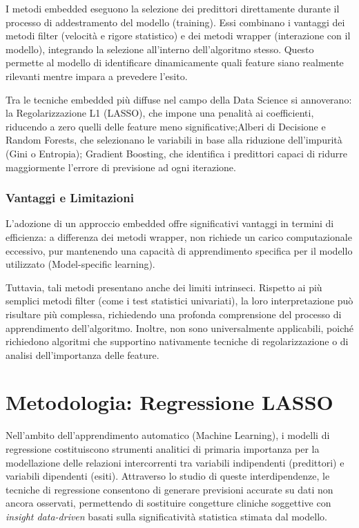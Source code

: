 \documentclass[11pt, oneside, noexaminfo]{sapthesis}   	%
\begin{document}
I metodi embedded eseguono la selezione dei predittori direttamente durante il processo di addestramento del modello (training). Essi combinano i vantaggi dei metodi filter (velocità e rigore statistico) e dei metodi wrapper (interazione con il modello), integrando la selezione all'interno dell'algoritmo stesso. Questo permette al modello di identificare dinamicamente quali feature siano realmente rilevanti mentre impara a prevedere l'esito.

Tra le tecniche embedded più diffuse nel campo della Data Science si annoverano:
la {Regolarizzazione L1 (LASSO)}, che impone una penalità ai coefficienti, riducendo a zero quelli delle feature meno significative;{Alberi di Decisione e Random Forests}, che selezionano le variabili in base alla riduzione dell'impurità (Gini o Entropia); {Gradient Boosting}, che identifica i predittori capaci di ridurre maggiormente l'errore di previsione ad ogni iterazione.

\subsubsection{Vantaggi e Limitazioni}
L'adozione di un approccio embedded offre significativi vantaggi in termini di efficienza: a differenza dei metodi wrapper, non richiede un carico computazionale eccessivo, pur mantenendo una capacità di apprendimento specifica per il modello utilizzato (Model-specific learning).

Tuttavia, tali metodi presentano anche dei limiti intrinseci. Rispetto ai più semplici metodi filter (come i test statistici univariati), la loro interpretazione può risultare più complessa, richiedendo una profonda comprensione del processo di apprendimento dell'algoritmo. Inoltre, non sono universalmente applicabili, poiché richiedono algoritmi che supportino nativamente tecniche di regolarizzazione o di analisi dell'importanza delle feature.

\section{Metodologia: Regressione LASSO}
Nell'ambito dell'apprendimento automatico (Machine Learning), i modelli di regressione costituiscono strumenti analitici di primaria importanza per la modellazione delle relazioni intercorrenti tra variabili indipendenti (predittori) e variabili dipendenti (esiti). Attraverso lo studio di queste interdipendenze, le tecniche di regressione consentono di generare previsioni accurate su dati non ancora osservati, permettendo di sostituire congetture cliniche soggettive con \textit{insight data-driven} basati sulla significatività statistica stimata dal modello.
\end{document}
